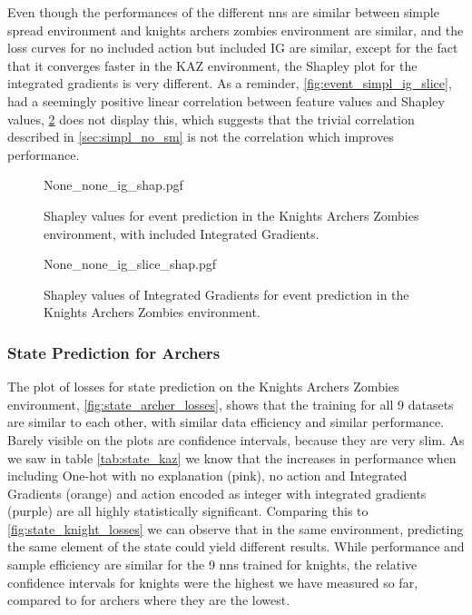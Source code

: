 \documentclass[UKenglish]{uiomasterthesis}
\begin{document}
Even though the performances of the different \acp{nn} are similar between simple spread environment and knights archers zombies environment are similar, and the loss curves for no included action but included IG are similar, except for the fact that it converges faster in the KAZ environment, the Shapley plot for the integrated gradients is very different. As a reminder, \cref{fig:event_simpl_ig_slice}, had a seemingly positive linear correlation between feature values and Shapley values, \cref{fig:event_archer_ig_slice} does not display this, which suggests that the trivial correlation described in \cref{sec:simpl_no_sm} is not the correlation which improves performance.

\begin{figure}[H]
\centering
{None_none_ig_shap.pgf}
\caption{Shapley values for event prediction in the Knights Archers Zombies environment, with included Integrated Gradients.}
\label{fig:event_archer_ig_shap}
\end{figure}

\begin{figure}[H]
\centering
{None_none_ig_slice_shap.pgf}
\caption{Shapley values of Integrated Gradients for event prediction in the Knights Archers Zombies environment.}
\label{fig:event_archer_ig_slice}
\end{figure}



\subsubsection{State Prediction for Archers}

The plot of losses for state prediction on the Knights Archers Zombies environment, \cref{fig:state_archer_losses}, shows that the training for all 9 datasets are similar to each other, with similar data efficiency and similar performance. Barely visible on the plots are confidence intervals, because they are very slim. As we saw in table \cref{tab:state_kaz} we know that the increases in performance when including One-hot with no explanation (pink), no action and Integrated Gradients (orange) and action encoded as integer with integrated gradients (purple) are all highly statistically significant. Comparing this to \cref{fig:state_knight_losses} we can observe that in the same environment, predicting the same element of the state could yield different results. While performance and sample efficiency are similar for the 9 \acp{nn} trained for knights, the relative confidence intervals for knights were the highest we have measured so far, compared to for archers where they are the lowest.
\end{document}
